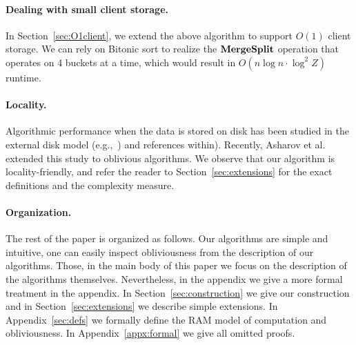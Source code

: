 \paragraph{Dealing with small client storage.}
In Section~\ref{sec:O1client}, we extend the above algorithm
to support $O(1)$ client storage. 
We can rely on 
Bitonic sort to realize the ${\bf MergeSplit}$ operation that operates on 4 buckets at a time,
which would result in $O(n\log n\cdot \log^2 Z)$
runtime. %

\paragraph{Locality.} Algorithmic performance when the data is stored on disk has been studied in the external disk model (e.g.,~\cite{RuemmlerW94,ArgeFGV97,Vitter01,Vitter06}) and references within). Recently, Asharov et al.~\cite{AsharovCNPRS19} extended this study to oblivious algorithms.  We observe that our algorithm is locality-friendly, and refer the reader to Section~\ref{sec:extensions} for the exact definitions and the complexity measure.


\paragraph{Organization.}
The rest of the paper is organized as follows. Our algorithms are simple and intuitive, one can easily inspect obliviousness from the description of our algorithms. Those, in the main body of this paper we focus on the description of the algorithms themselves. Nevertheless, in the appendix we give a more formal treatment in the appendix. In Section~\ref{sec:construction} we give our construction and in Section~\ref{sec:extensions} we describe simple extensions. In Appendix~\ref{sec:defs} we formally define the RAM model of computation and obliviousness. In Appendix~\ref{appx:formal} we give all omitted proofs. 

